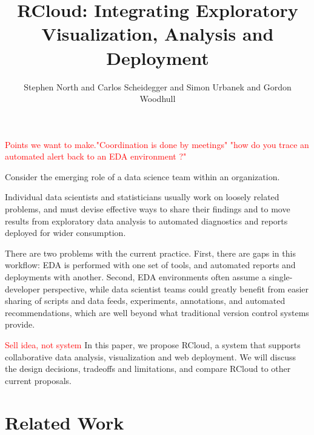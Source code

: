 \documentclass[review,journal]{vgtc}         %
\title{RCloud: Integrating Exploratory Visualization, Analysis and Deployment}
\author{Stephen North and Carlos Scheidegger and Simon Urbanek and
  Gordon Woodhull}
\newcommand{\todo}[1]{\textcolor{red}{#1}}
\begin{document}



\maketitle

\todo{Points we want to make."Coordination is done by meetings" "how do you trace an automated alert back to an EDA environment ?"}

Consider the emerging role of a data science team within an
organization. 

Individual data scientists and statisticians usually
work on loosely related problems, and must devise effective ways to 
share their findings and to move results from exploratory data analysis
to automated diagnostics and reports deployed for wider consumption.

There are two problems with the current
practice. First, there are gaps in this workflow: EDA is performed
with one set of tools, and automated reports and deployments with another.
Second, EDA environments often assume a single-developer perspective,
while data scientist teams could greatly benefit from easier sharing of
scripts and data feeds, experiments, annotations, and automated
recommendations, which are well beyond what traditional version control
systems provide. 

\todo{Sell idea, not system} In this paper, we propose RCloud, a system that supports
collaborative data analysis, visualization and web deployment. We will
discuss the design decisions, tradeoffs and limitations, and compare RCloud
to other current proposals.



\section{Related Work}
\end{document}
